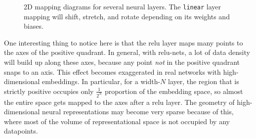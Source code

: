 \begin{figure}[h]
{\begin{minipage}{0.28\textwidth}
\end{minipage}
}
\caption{2D mapping diagrams for several neural layers. The \texttt{linear} layer mapping will shift, stretch, and rotate depending on its weights and biases.}
\label{fig:neural_nets_as_data_transformations:2D_mapping_diagrams}
\end{figure}



One interesting thing to notice here is that the relu layer maps many points to the axes of the positive quadrant. In general, with relu-nets, a lot of data density will build up along these axes, because any point \textit{not} in the positive quadrant snaps to an axis. This effect becomes exaggerated in real networks with high-dimensional embeddings. In particular, for a width-$N$ layer, the region that is strictly positive occupies only $\frac{1}{2^N}$ proportion of the embedding space, so almost the entire space gets mapped to the axes after a relu layer. The geometry of high-dimensional neural representations may become very sparse because of this, where most of the volume of representational space is not occupied by any datapoints.


